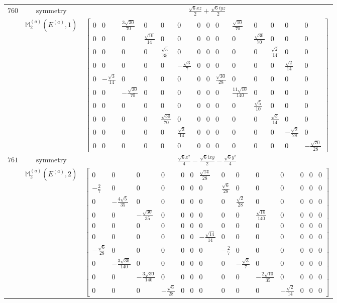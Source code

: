 \documentclass[fleqn,8pt,landscape]{jsarticle}
\begin{document}
\begin{longtable}{ccc}
$ 760 $ & $ \text{symmetry} $ & $ \frac{\sqrt{6} x z}{2} + \frac{\sqrt{6} i y z}{2} $ \\
$  $ & $ \mathbb{M}_{2}^{(a)}(E^{(a)},1) $ & $ \begin{bmatrix} 0 & 0 & \frac{3 \sqrt{30}}{70} & 0 & 0 & 0 & 0 & 0 & 0 & \frac{\sqrt{10}}{70} & 0 & 0 & 0 & 0 \\ 0 & 0 & 0 & \frac{\sqrt{10}}{14} & 0 & 0 & 0 & 0 & 0 & 0 & \frac{\sqrt{30}}{70} & 0 & 0 & 0 \\ 0 & 0 & 0 & 0 & \frac{\sqrt{5}}{35} & 0 & 0 & 0 & 0 & 0 & 0 & \frac{\sqrt{2}}{14} & 0 & 0 \\ 0 & 0 & 0 & 0 & 0 & - \frac{\sqrt{3}}{7} & 0 & 0 & 0 & 0 & 0 & 0 & \frac{\sqrt{2}}{14} & 0 \\ 0 & - \frac{\sqrt{3}}{14} & 0 & 0 & 0 & 0 & 0 & 0 & \frac{\sqrt{30}}{28} & 0 & 0 & 0 & 0 & 0 \\ 0 & 0 & - \frac{\sqrt{30}}{70} & 0 & 0 & 0 & 0 & 0 & 0 & \frac{11 \sqrt{10}}{140} & 0 & 0 & 0 & 0 \\ 0 & 0 & 0 & 0 & 0 & 0 & 0 & 0 & 0 & 0 & \frac{\sqrt{5}}{10} & 0 & 0 & 0 \\ 0 & 0 & 0 & 0 & \frac{\sqrt{30}}{70} & 0 & 0 & 0 & 0 & 0 & 0 & \frac{\sqrt{3}}{14} & 0 & 0 \\ 0 & 0 & 0 & 0 & 0 & \frac{\sqrt{3}}{14} & 0 & 0 & 0 & 0 & 0 & 0 & - \frac{\sqrt{2}}{28} & 0 \\ 0 & 0 & 0 & 0 & 0 & 0 & 0 & 0 & 0 & 0 & 0 & 0 & 0 & - \frac{\sqrt{70}}{28} \end{bmatrix} $ \\ \hline
$ 761 $ & $ \text{symmetry} $ & $ \frac{\sqrt{6} x^{2}}{4} - \frac{\sqrt{6} i x y}{2} - \frac{\sqrt{6} y^{2}}{4} $ \\
$  $ & $ \mathbb{M}_{2}^{(a)}(E^{(a)},2) $ & $ \begin{bmatrix} 0 & 0 & 0 & 0 & 0 & 0 & \frac{\sqrt{14}}{28} & 0 & 0 & 0 & 0 & 0 & 0 & 0 \\ - \frac{2}{7} & 0 & 0 & 0 & 0 & 0 & 0 & \frac{\sqrt{6}}{28} & 0 & 0 & 0 & 0 & 0 & 0 \\ 0 & - \frac{4 \sqrt{5}}{35} & 0 & 0 & 0 & 0 & 0 & 0 & \frac{\sqrt{2}}{28} & 0 & 0 & 0 & 0 & 0 \\ 0 & 0 & - \frac{\sqrt{30}}{35} & 0 & 0 & 0 & 0 & 0 & 0 & \frac{\sqrt{10}}{140} & 0 & 0 & 0 & 0 \\ 0 & 0 & 0 & 0 & 0 & 0 & 0 & 0 & 0 & 0 & 0 & 0 & 0 & 0 \\ 0 & 0 & 0 & 0 & 0 & 0 & - \frac{\sqrt{14}}{14} & 0 & 0 & 0 & 0 & 0 & 0 & 0 \\ - \frac{\sqrt{6}}{28} & 0 & 0 & 0 & 0 & 0 & 0 & - \frac{2}{7} & 0 & 0 & 0 & 0 & 0 & 0 \\ 0 & - \frac{3 \sqrt{30}}{140} & 0 & 0 & 0 & 0 & 0 & 0 & - \frac{\sqrt{3}}{7} & 0 & 0 & 0 & 0 & 0 \\ 0 & 0 & - \frac{3 \sqrt{30}}{140} & 0 & 0 & 0 & 0 & 0 & 0 & - \frac{2 \sqrt{10}}{35} & 0 & 0 & 0 & 0 \\ 0 & 0 & 0 & - \frac{\sqrt{6}}{28} & 0 & 0 & 0 & 0 & 0 & 0 & - \frac{\sqrt{2}}{14} & 0 & 0 & 0 \end{bmatrix} $ \\ \hline

\end{longtable}
\end{document}
